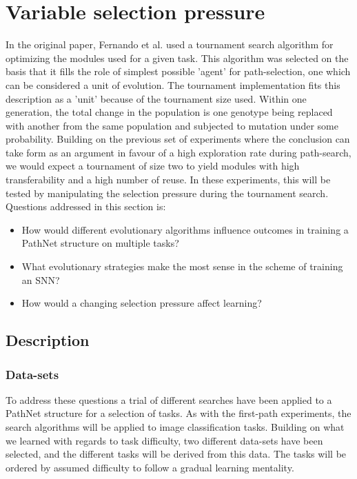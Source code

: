 \chapter{Variable selection pressure}
In the original paper, Fernando et al. used a tournament search algorithm for optimizing the modules used for a given task. This algorithm was selected on the basis that it fills the role of simplest possible 'agent' for path-selection, one which can be considered a unit of evolution.  The tournament implementation fits this description as a 'unit' because of the tournament size used. Within one generation, the total change in the population is one genotype being replaced with another from the same population and subjected to mutation under some probability. Building on the previous set of experiments where the conclusion can take form as an argument in favour of a high exploration rate during path-search, we would expect a tournament of size two to yield modules with high transferability and a high number of reuse. 
In these experiments, this will be tested by manipulating the selection pressure during the tournament search. Questions addressed in this section is: 
\begin{itemize}
    \item How would different evolutionary algorithms influence outcomes in training a PathNet structure on multiple tasks?
    \item What evolutionary strategies make the most sense in the scheme of training an SNN?
    \item How would a changing selection pressure affect learning? 
\end{itemize}

\section{Description}\label{Search-datasets}
\subsection{Data-sets} \label{Search-experiment:Datasets}
To address these questions a trial of different searches have been applied to a PathNet structure for a selection of tasks. As with the first-path experiments, the search algorithms will be applied to image classification tasks. Building on what we learned with regards to task difficulty, two different data-sets have been selected, and the different tasks will be derived from this data. The tasks will be ordered by assumed difficulty to follow a gradual learning mentality. 


